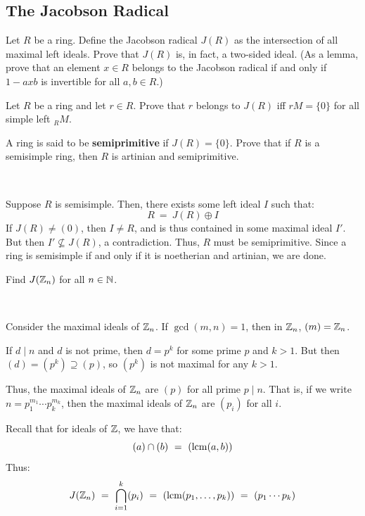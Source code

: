 \subsection{The Jacobson Radical}
\setcounter{subsection}{1}

\begin{exr}[title=secretly Lemma 4.1 part a)] %
	Let $R$ be a ring.
	Define the Jacobson radical $J(R)$ as the intersection of all maximal left ideals.
	Prove that $J(R)$ is, in fact, a two-sided ideal.
	(As a lemma, prove that an element $x\in R$ belongs to the Jacobson radical if and only if $1-axb$ is invertible for all $a,b\in R$.)
\end{exr}


\nq
\begin{exr}[title=secretly Lemma 4.1 part b)] %
	Let $R$ be a ring and let $r\in R$.
	Prove that $r$ belongs to $J(R)$ iff $rM=\{0\}$ for all simple left $_{R}M$.
\end{exr}


\nq
\begin{exr}[title=secretly Theorem 4.14 part a)]
	A ring is said to be \textbf{semiprimitive} if $J(R)=\{0\}$.
	Prove that if $R$ is a semisimple ring, then
	$R$ is artinian and semiprimitive.
\end{exr} \

\begin{pf}
	Suppose $R$ is semisimple. Then, there exists some left ideal $I$ such that:
	\begin{equation*}
		R \ = \ J(R)\oplus I
	\end{equation*}
	If $J(R)\neq(0)$, then $I\neq R$, and is thus contained in some maximal ideal $I'$.
	But then $I'\nsubseteq J(R)$, a contradiction.
	Thus, $R$ must be semiprimitive.
	Since a ring is semisimple if and only if it is noetherian and artinian,
	we are done.
\end{pf}


\nq
\begin{exr}
	Find $J(\mathbb{Z}_n)$ for all $n\in\mathbb{N}$.
\end{exr} \

\begin{pf}
	Consider the maximal ideals of $\mathbb{Z}_{n}$.
	If $\gcd(m,n)=1$, then in $\mathbb{Z}_{n}$, $(m)=\mathbb{Z}_{n}$.

	If $d\mid n$ and $d$ is not prime, then $d=p^{k}$ for some prime $p$ and $k>1$.
	But then $(d)=(p^{k})\supseteq(p)$, so $(p^{k})$ is not maximal for any $k>1$.

	Thus, the maximal ideals of $\mathbb{Z}_{n}$ are $(p)$ for all prime $p\mid n$.
	That is, if we write $n=p_{1}^{m_{1}}\cdots p_{k}^{m_{k}}$,
	then the maximal ideals of $\mathbb{Z}_{n}$ are $(p_{i})$ for all $i$.

	Recall that for ideals of $\mathbb{Z}$, we have that:
	\begin{equation*}
		(a)\cap(b) \ = \ (\lcm(a,b))
	\end{equation*}
	Thus:
	\begin{equation*}
		J(\bZ_{n}) \ = \ \bigcap_{i=1}^{k}(p_{i})
		\ = \ (\lcm(p_{1},\dots,p_{k}))
		\ = \ (p_{1}\cdots p_{k})
	\end{equation*}
\end{pf}


